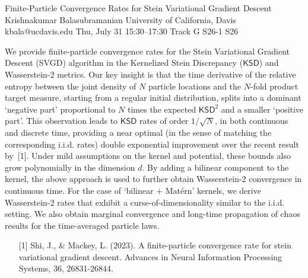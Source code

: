 \begin{talk}
  {Finite-Particle Convergence Rates for Stein Variational Gradient Descent}%
  {Krishnakumar Balasubramanian}%
  {University of California, Davis}%
  {kbala@ucdavis.edu}%
  {}%
  {}%
  {Thu, July 31 15:30–17:30 Track G}%
  {S26-1}%
  {S26}%
  {}%
  
				
			
 We provide finite-particle convergence rates for the Stein Variational Gradient Descent (SVGD) algorithm in the Kernelized Stein Discrepancy ($\mathsf{KSD}$) and Wasserstein-2 metrics. Our key insight is that the time derivative of the relative entropy between the joint density of $N$ particle locations and the $N$-fold product target measure, starting from a regular initial distribution, splits into a dominant `negative part' proportional to $N$ times the expected $\mathsf{KSD}^2$ and a smaller `positive part'. This observation leads to $\mathsf{KSD}$ rates of order $1/\sqrt{N}$, in both continuous and discrete time, providing a near optimal (in the sense of matching the corresponding i.i.d. rates) double exponential improvement over the recent result by~[1]. Under mild assumptions on the kernel and potential, these bounds also grow polynomially in the dimension $d$. By adding a bilinear component to the kernel, the above approach is used to further obtain Wasserstein-2 convergence in continuous time. For the case of `bilinear + Mat\'ern' kernels, we derive Wasserstein-2 rates that exhibit a curse-of-dimensionality similar to the i.i.d. setting. We also obtain marginal convergence and long-time propagation of chaos results for the time-averaged particle laws. 

\medskip


\begin{enumerate}
	\item[{[1]}] Shi, J., \& Mackey, L. (2023). A finite-particle convergence rate for stein variational gradient descent. Advances in Neural Information Processing Systems, 36, 26831-26844.
\end{enumerate}

\end{talk}

